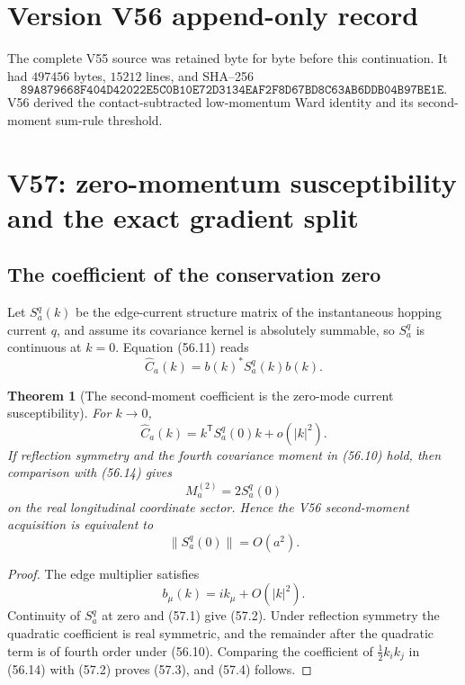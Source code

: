 \documentclass[11pt]{article}
\newtheorem{theorem}{Theorem}[section]
\theoremstyle{remark}
\begin{document}
\section*{Version V56 append-only record}
The complete V55 source was retained byte for byte before this
continuation.  It had \(497456\) bytes, \(15212\) lines, and SHA--256
\[
 \texttt{89A879668F404D42022E5C0B10E72D3134EAF2F8D67BD8C63AB6DDB04B97BE1E}.
\]
V56 derived the contact-subtracted low-momentum Ward identity and its
second-moment sum-rule threshold.


\section{V57: zero-momentum susceptibility and the exact gradient split}
\label{sec:v17v57}

\subsection{The coefficient of the conservation zero}

Let \(S_a^q(k)\) be the edge-current structure matrix of the
instantaneous hopping current \(q\), and assume its covariance kernel
is absolutely summable, so \(S_a^q\) is continuous at \(k=0\).
Equation (56.11) reads
\[
 \widehat C_a(k)=b(k)^*S_a^q(k)b(k).              \tag{57.1}
\]

\begin{theorem}[The second-moment coefficient is the zero-mode
current susceptibility]
\label{thm:v17v57-zero}
For \(k\to0\),
\[
\boxed{
 \widehat C_a(k)
 =
 k^{\mathsf T}S_a^q(0)k+o(|k|^2).}               \tag{57.2}
\]
If reflection symmetry and the fourth covariance moment in (56.10)
hold, then comparison with (56.14) gives
\[
 M_a^{(2)}=2S_a^q(0)                              \tag{57.3}
\]
on the real longitudinal coordinate sector.  Hence the V56
second-moment acquisition is equivalent to
\[
 \|S_a^q(0)\|=O(a^2).                             \tag{57.4}
\]
\end{theorem}

\begin{proof}
The edge multiplier satisfies
\[
 b_\mu(k)=ik_\mu+O(|k|^2).                        \tag{57.5}
\]
Continuity of \(S_a^q\) at zero and (57.1) give (57.2).  Under
reflection symmetry the quadratic coefficient is real symmetric, and
the remainder after the quadratic term is of fourth order under
(56.10).  Comparing the coefficient of
\(\frac12k_ik_j\) in (56.14) with (57.2) proves (57.3), and (57.4)
follows.
\end{proof}
\end{document}
